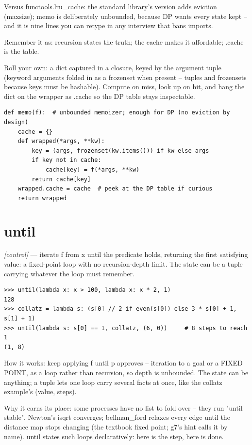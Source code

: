 \documentclass[11pt,letterpaper]{book}
\begin{document}
Versus functools.lru\_cache: the standard library's version adds eviction (maxsize); memo is deliberately unbounded, because DP wants every state kept -- and it is nine lines you can retype in any interview that bans imports.


Remember it as: recursion states the truth; the cache makes it affordable; .cache is the table.


Roll your own: a dict captured in a closure, keyed by the argument tuple (keyword arguments folded in as a frozenset when present -- tuples and frozensets because keys must be hashable). Compute on miss, look up on hit, and hang the dict on the wrapper as .cache so the DP table stays inspectable.

\begin{lstlisting}[style=code]
def memo(f):  # unbounded memoizer; enough for DP (no eviction by design)
    cache = {}
    def wrapped(*args, **kw):
        key = (args, frozenset(kw.items())) if kw else args
        if key not in cache:
            cache[key] = f(*args, **kw)
        return cache[key]
    wrapped.cache = cache  # peek at the DP table if curious
    return wrapped
\end{lstlisting}

\section{until}
\noindent\textit{[control]} --- iterate f from x until the predicate holds, returning the first satisfying value: a fixed-point loop with no recursion-depth limit. The state can be a tuple carrying whatever the loop must remember.
\begin{lstlisting}[style=spec]
>>> until(lambda x: x > 100, lambda x: x * 2, 1)
128
>>> collatz = lambda s: (s[0] // 2 if even(s[0]) else 3 * s[0] + 1, s[1] + 1)
>>> until(lambda s: s[0] == 1, collatz, (6, 0))     # 8 steps to reach 1
(1, 8)
\end{lstlisting}

How it works: keep applying f until p approves -- iteration to a goal or a FIXED POINT, as a loop rather than recursion, so depth is unbounded. The state can be anything; a tuple lets one loop carry several facts at once, like the collatz example's (value, steps).


Why it earns its place: some processes have no list to fold over -- they run "until stable". Newton's isqrt converges; bellman\_ford relaxes every edge until the distance map stops changing (the textbook fixed point; g7's hint calls it by name). until states such loops declaratively: here is the step, here is done.
\end{document}

